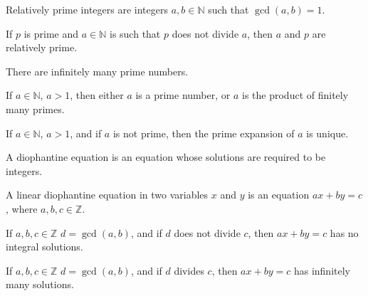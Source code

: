 \documentclass[crop=false,class=article,oneside]{standalone}
\begin{document}
        \begin{definition}
           Relatively prime integers are integers
           $a,b\in\mathbb{N}$ such that $\gcd(a,b)=1$.
        \end{definition}
        \begin{theorem*}
           If $p$ is prime and $a\in\mathbb{N}$ is
           such that $p$ does not divide $a$, then $a$ and $p$
           are relatively prime.
        \end{theorem*}
        \begin{theorem*}
           There are infinitely many prime numbers.
        \end{theorem*}
        \begin{theorem*}
           If $a\in\mathbb{N}$, $a>1$, then either
           $a$ is a prime number, or $a$ is the product
           of finitely many primes.
        \end{theorem*}
        \begin{theorem*}
           If $a\in\mathbb{N}$, $a>1$, and if $a$ is not
           prime, then the prime expansion of $a$ is
           unique.
        \end{theorem*}
        \begin{definition}
           A diophantine equation is an equation whose
           solutions are required to be integers.
        \end{definition}
        \begin{definition}
           A linear diophantine equation in two variables
           $x$ and $y$ is an equation
           $ax+by=c$, where $a,b,c\in\mathbb{Z}$.
        \end{definition}
        \begin{theorem*}
           If $a,b,c\in\mathbb{Z}$ $d=\gcd(a,b)$,
           and if $d$ does not divide $c$,
           then $ax+by=c$ has no integral solutions.
        \end{theorem*}
        \begin{theorem*}
           If $a,b,c\in\mathbb{Z}$ $d=\gcd(a,b)$,
           and if $d$ divides $c$,
           then $ax+by=c$ has infinitely many solutions.
        \end{theorem*}
\end{document}
